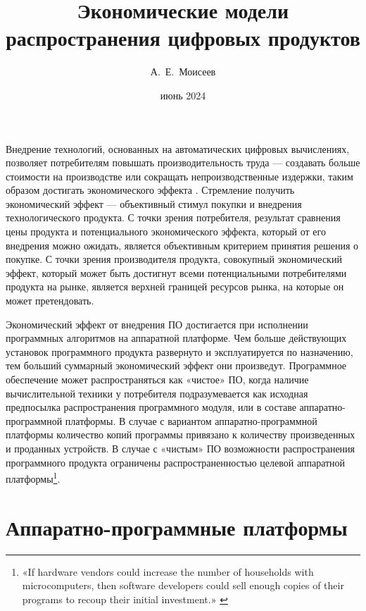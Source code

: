 \documentclass{article}
\title{Экономические модели распространения цифровых продуктов}
\author{А.~Е.~Моисеев}
\date{июнь 2024}
\begin{document}
\maketitle

Внедрение технологий, основанных на автоматических цифровых вычислениях, позволяет потребителям повышать производительность труда — создавать больше стоимости на производстве или сокращать непроизводственные издержки, таким образом достигать экономического эффекта \cite{ecoEffects}. Стремление получить экономический эффект — объективный стимул покупки и внедрения технологического продукта. С точки зрения потребителя, результат сравнения цены продукта и потенциального экономического эффекта, который от его внедрения можно ожидать, является объективным критерием принятия решения о покупке. С точки зрения производителя продукта, совокупный экономический эффект, который может быть достигнут всеми потенциальными потребителями продукта на рынке, является верхней границей ресурсов рынка, на которые он может претендовать.

Экономический эффект от внедрения ПО достигается при исполнении программных алгоритмов на аппаратной платформе. Чем больше действующих установок программного продукта развернуто и эксплуатируется по назначению, тем больший суммарный экономический эффект они произведут. Программное обеспечение может распространяться как «чистое» ПО, когда наличие вычислительной техники у потребителя подразумевается как исходная предпосылка распространения программного модуля, или в составе аппаратно-программной платформы. В случае с вариантом аппаратно-программной платформы количество копий программы привязано к количеству произведенных и проданных устройств. В случае с «чистым» ПО возможности распространения программного продукта ограничены распространенностью целевой аппаратной платформы\footnote{«If hardware vendors could increase the number of households with microcomputers, then software developers could sell enough copies of their programs to recoup their initial investment.» \cite{driscollOpenLetter}}.

\section*{Аппаратно-программные платформы}
\end{document}
